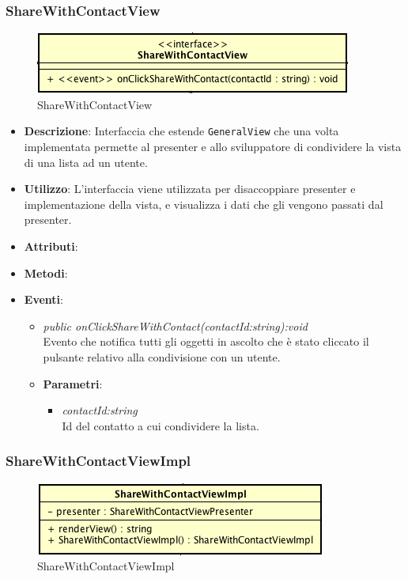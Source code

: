 \subsubsection{ShareWithContactView}

\label{ShareWithContactView}
\begin{figure}[ht]
	\centering
	\includegraphics[scale=0.5]{Sezioni/SottosezioniST/img/app/ShareWithContactView.png}
	\caption{ShareWithContactView}
\end{figure}

\begin{itemize}
\item \textbf{Descrizione}: Interfaccia che estende \texttt{GeneralView} che una volta implementata permette al presenter e allo sviluppatore di condividere la vista di una lista ad un utente.
\item \textbf{Utilizzo}: L'interfaccia viene utilizzata per disaccoppiare presenter e implementazione della vista, e visualizza i dati che gli vengono passati dal presenter.
\item \textbf{Attributi}: 
\item \textbf{Metodi}:
\item \textbf{Eventi}:
\begin{itemize}
\item \textit{public onClickShareWithContact(contactId:string):void}\\
	Evento che notifica tutti gli oggetti in ascolto che è stato cliccato il pulsante relativo alla condivisione con un utente.
	\item{\textbf{Parametri}: \begin{itemize}
	\item \textit{contactId:string}\\
	Id del contatto a cui condividere la lista.
	\end{itemize}}
\end{itemize}
\end{itemize}

\subsubsection{ShareWithContactViewImpl}

\label{ShareWithContactViewImpl}
\begin{figure}[ht]
	\centering
	\includegraphics[scale=0.5]{Sezioni/SottosezioniST/img/app/ShareWithContactViewImpl.png}
	\caption{ShareWithContactViewImpl}
\end{figure}

